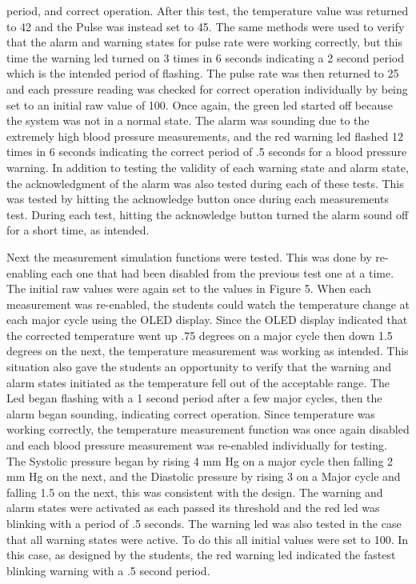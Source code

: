 \documentclass[12pt]{article} %
\begin{document}
    period, and correct operation. After this test, the temperature value was
    returned to 42 and the Pulse was instead set to 45.  The same methods were
    used to verify that the alarm and warning states for pulse rate were
    working correctly, but this time the warning led turned on 3 times in 6
    seconds indicating a 2 second period which is the intended period of
    flashing. The pulse rate was then returned to 25 and each pressure reading
    was checked for correct operation individually by being set to an initial
    raw value of 100. Once again, the green led started off because the system
    was not in a normal state. The alarm was sounding due to the extremely high
    blood pressure measurements, and the red warning led flashed 12 times in 6
    seconds indicating the correct period of .5 seconds for a blood pressure
    warning. In addition to testing the validity of each warning state and
    alarm state, the acknowledgment of the alarm was also tested during each
    of these tests. This was tested by hitting the acknowledge button once
    during each measurements test. During each test, hitting the acknowledge
    button turned the alarm sound off for a short time, as intended. 


    Next the measurement simulation functions were tested. This was done by
    re-enabling each one that had been disabled from the previous test one at a
    time. The initial raw values were again set to the values in Figure 5. When
    each measurement was re-enabled, the students could watch the temperature
    change at each major cycle using the OLED display. Since the OLED display
    indicated that the corrected temperature went up .75 degrees on a major
    cycle then down 1.5 degrees on the next, the temperature measurement was
    working as intended.  This situation also gave the students an opportunity
    to verify that the warning and alarm states initiated as the temperature
    fell out of the acceptable range.  The Led began flashing with a 1 second
    period after a few major cycles, then the alarm began sounding, indicating
    correct operation. Since temperature was working correctly, the temperature
    measurement function was once again disabled and each blood pressure
    measurement was re-enabled individually for testing. The Systolic pressure
    began by rising 4 mm Hg on a major cycle then falling 2 mm Hg on the next,
    and the Diastolic pressure by rising 3 on a Major cycle and falling 1.5 on
    the next, this was consistent with the design. The warning and alarm states
    were activated as each passed its threshold and the red led was blinking
    with a period of .5 seconds.  The warning led was also tested in the case
    that all warning states were active. To do this all initial values were set
    to 100. In this case, as designed by the students, the red warning led
    indicated the fastest blinking warning with a .5 second period. 
    
\end{document}
